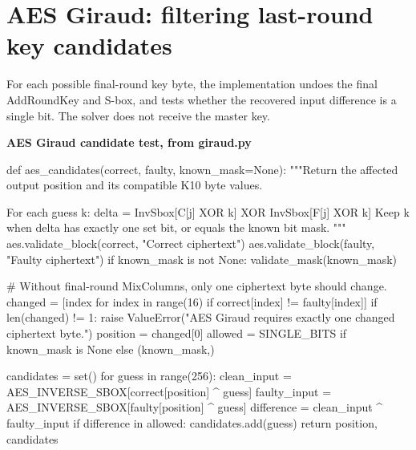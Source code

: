 \section{AES Giraud: filtering last-round key candidates}
For each possible final-round key byte, the implementation undoes the final AddRoundKey and S-box, and tests whether the recovered input difference is a single bit. The solver does not receive the master key.
\par\smallskip\noindent\textbf{AES Giraud candidate test, from giraud.py}\par
\begin{lightcode}
def aes_candidates(correct, faulty, known_mask=None):
    """Return the affected output position and its compatible K10 byte values.

    For each guess k:
      delta = InvSbox[C[j] XOR k] XOR InvSbox[F[j] XOR k]
    Keep k when delta has exactly one set bit, or equals the known bit mask.
    """
    aes.validate_block(correct, "Correct ciphertext")
    aes.validate_block(faulty, "Faulty ciphertext")
    if known_mask is not None:
        validate_mask(known_mask)

    # Without final-round MixColumns, only one ciphertext byte should change.
    changed = [index for index in range(16) if correct[index] != faulty[index]]
    if len(changed) != 1:
        raise ValueError("AES Giraud requires exactly one changed ciphertext byte.")
    position = changed[0]
    allowed = SINGLE_BITS if known_mask is None else (known_mask,)

    candidates = set()
    for guess in range(256):
        clean_input = AES_INVERSE_SBOX[correct[position] ^ guess]
        faulty_input = AES_INVERSE_SBOX[faulty[position] ^ guess]
        difference = clean_input ^ faulty_input
        if difference in allowed:
            candidates.add(guess)
    return position, candidates
\end{lightcode}
